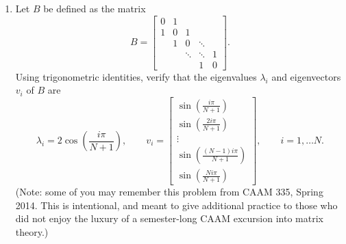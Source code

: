 \begin{enumerate}
\item Let $B$ be defined as the matrix
\[
B =  \left[\begin{array}{rrrrr}
              0 & 1 \\[0.25em]
               1 & 0 & 1 \\
                 &  1  & 0 & \ddots \\
                 & & \ddots & \ddots & 1 \\[0.25em]
                 & & & 1 & 0 
               \end{array}\right].
\]
Using trigonometric identities, verify that the eigenvalues $\lambda_i$  and eigenvectors $v_i$ of $B$ are
\[
\lambda_i = 2\cos\left(\frac{i \pi}{N+1}\right), \qquad v_i = \left[\begin{array}{c}
\sin\left(\frac{i\pi}{N+1}\right)\\
\sin\left(\frac{2i\pi}{N+1}\right)\\
\vdots\\
\sin\left(\frac{(N-1)i \pi}{N+1}\right)\\
\sin\left(\frac{N i \pi}{N+1}\right)
\end{array}\right], \qquad i = 1,\ldots N.
\]
(Note: some of you may remember this problem from CAAM 335, Spring 2014. This is intentional, and meant to give additional practice to those who did not enjoy the luxury of a semester-long CAAM excursion into matrix theory.)



\end{enumerate}
